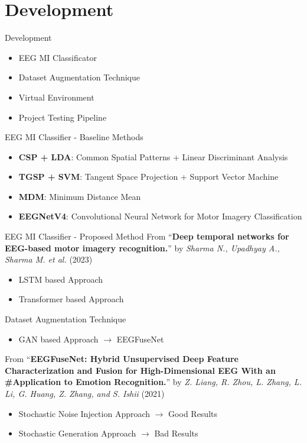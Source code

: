 \section{Development}
\begin{frame}{Development}
\begin{itemize}
    \item EEG MI Classificator
    \item Dataset Augmentation Technique
    \item Virtual Environment
    \item Project Testing Pipeline
\end{itemize}
\end{frame}

\begin{frame}{EEG MI Classifier - Baseline Methods}
\begin{itemize}
    \item \textbf{CSP + LDA}: Common Spatial Patterns + Linear Discriminant Analysis
    \item \textbf{TGSP + SVM}: Tangent Space Projection + Support Vector Machine
    \item \textbf{MDM}: Minimum Distance Mean
    \item \textbf{EEGNetV4}: Convolutional Neural Network for Motor Imagery Classification
\end{itemize}
\end{frame}

\begin{frame}{EEG MI Classifier - Proposed Method}
    From ``\textbf{Deep temporal networks for EEG-based motor imagery recognition.}'' by \textit{Sharma N., Upadhyay A., Sharma M. et al.} (2023)
    \begin{itemize}
        \item LSTM based Approach
        \item Transformer based Approach
    \end{itemize}
\end{frame}

\begin{frame}{Dataset Augmentation Technique}
    \begin{itemize}
        \item GAN based Approach $\rightarrow{}$ EEGFuseNet
    \end{itemize}
    From ``\textbf{EEGFuseNet: Hybrid Unsupervised Deep Feature Characterization and Fusion for High-Dimensional EEG With an \#Application to Emotion Recognition.}'' by \textit{Z. Liang, R. Zhou, L. Zhang, L. Li, G. Huang, Z. Zhang, and S. Ishii} (2021)
    \begin{itemize}
        \item Stochastic Noise Injection Approach $\rightarrow{}$ Good Results
        \item Stochastic Generation Approach $\rightarrow{}$ Bad Results
    \end{itemize}
\end{frame}

